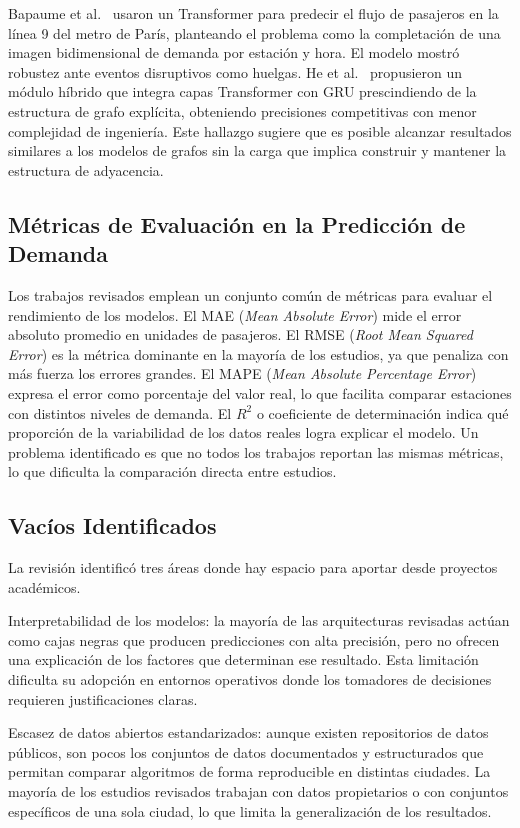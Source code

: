 \documentclass[preprint,12pt]{elsarticle}
\begin{document}
Bapaume et al.\ \cite{bapaume2023} usaron un Transformer para predecir el flujo de pasajeros en la línea 9 del metro de París, planteando el problema como la completación de una imagen bidimensional de demanda por estación y hora. El modelo mostró robustez ante eventos disruptivos como huelgas. He et al.\ \cite{he2024} propusieron un módulo híbrido que integra capas Transformer con GRU prescindiendo de la estructura de grafo explícita, obteniendo precisiones competitivas con menor complejidad de ingeniería. Este hallazgo sugiere que es posible alcanzar resultados similares a los modelos de grafos sin la carga que implica construir y mantener la estructura de adyacencia.

\subsection{Métricas de Evaluación en la Predicción de Demanda}

Los trabajos revisados emplean un conjunto común de métricas para evaluar el rendimiento de los modelos. El MAE (\textit{Mean Absolute Error}) mide el error absoluto promedio en unidades de pasajeros. El RMSE (\textit{Root Mean Squared Error}) es la métrica dominante en la mayoría de los estudios, ya que penaliza con más fuerza los errores grandes. El MAPE (\textit{Mean Absolute Percentage Error}) expresa el error como porcentaje del valor real, lo que facilita comparar estaciones con distintos niveles de demanda. El $R^2$ o coeficiente de determinación indica qué proporción de la variabilidad de los datos reales logra explicar el modelo. Un problema identificado es que no todos los trabajos reportan las mismas métricas, lo que dificulta la comparación directa entre estudios.

\subsection{Vacíos Identificados}

La revisión identificó tres áreas donde hay espacio para aportar desde proyectos académicos.

Interpretabilidad de los modelos: la mayoría de las arquitecturas revisadas actúan como cajas negras que producen predicciones con alta precisión, pero no ofrecen una explicación de los factores que determinan ese resultado. Esta limitación dificulta su adopción en entornos operativos donde los tomadores de decisiones requieren justificaciones claras.

Escasez de datos abiertos estandarizados: aunque existen repositorios de datos públicos, son pocos los conjuntos de datos documentados y estructurados que permitan comparar algoritmos de forma reproducible en distintas ciudades. La mayoría de los estudios revisados trabajan con datos propietarios o con conjuntos específicos de una sola ciudad, lo que limita la generalización de los resultados.
\end{document}
